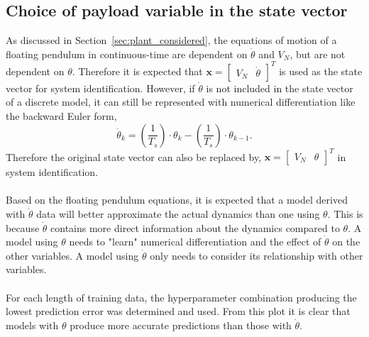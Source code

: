     \subsection{Choice of payload variable in the state vector}
        As discussed in Section~\ref{sec:plant_considered}, 
        the equations of motion of a floating pendulum in continuous-time are dependent on $\dot{\theta}$ and $V_N$, 
        but are not dependent on $\theta$.
        Therefore it is expected that 
        $
        \bm{x} = \begin{bmatrix}
            V_N & \dot{\theta}
        \end{bmatrix}^T
        $
        is used as the state vector for system identification.
        However, if $\dot{\theta}$ is not included in the state vector of a discrete model, 
        it can still be represented with numerical differentiation like the backward Euler form,
        \begin{equation}
            \dot{\theta}_k = (\frac{1}{T_s}) \cdot \theta_k - (\frac{1}{T_s}) \cdot \theta_{k-1} .
        \end{equation}
        Therefore the original state vector can also be replaced by,
        $
            \bm{x} = \begin{bmatrix}
                V_N & \theta
            \end{bmatrix}^T
        $
        in system identification.

        \paragraph{}
        Based on the floating pendulum equations, it is expected that a model derived with $\dot{\theta}$ data 
        will better approximate the actual dynamics than one using $\theta$.
        This is because $\dot{\theta}$ contains more direct information about the dynamics compared to $\theta$.
        A model using $\theta$ needs to "learn" numerical differentiation and the effect of $\dot{\theta}$ on the other variables.
        A model using $\dot{\theta}$ only needs to consider its relationship with other variables.

        

        \paragraph{}
        For each length of training data, the hyperparameter combination producing the lowest prediction error was determined and used.
        From this plot it is clear that models with $\theta$ produce more accurate predictions than those with $\dot{\theta}$.


